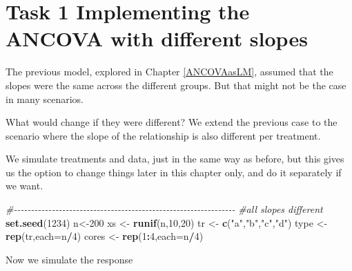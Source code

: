 \documentclass[
]{book}
\newenvironment{Shaded}{\begin{snugshade}}{\end{snugshade}}
\newcommand{\AttributeTok}[1]{\textcolor[rgb]{0.13,0.29,0.53}{#1}}
\newcommand{\CommentTok}[1]{\textcolor[rgb]{0.56,0.35,0.01}{\textit{#1}}}
\newcommand{\DecValTok}[1]{\textcolor[rgb]{0.00,0.00,0.81}{#1}}
\newcommand{\FunctionTok}[1]{\textcolor[rgb]{0.13,0.29,0.53}{\textbf{#1}}}
\newcommand{\NormalTok}[1]{#1}
\newcommand{\OtherTok}[1]{\textcolor[rgb]{0.56,0.35,0.01}{#1}}
\newcommand{\SpecialCharTok}[1]{\textcolor[rgb]{0.81,0.36,0.00}{\textbf{#1}}}
\newcommand{\StringTok}[1]{\textcolor[rgb]{0.31,0.60,0.02}{#1}}
\begin{document}
\section{Task 1 Implementing the ANCOVA with different slopes}\label{task-1-implementing-the-ancova-with-different-slopes}

The previous model, explored in Chapter \ref{ANCOVAasLM}, assumed that the slopes were the same across the different groups. But that might not be the case in many scenarios.

What would change if they were different? We extend the previous case to the scenario where the slope of the relationship is also different per treatment.

We simulate treatments and data, just in the same way as before, but this gives us the option to change things later in this chapter only, and do it separately if we want.

\begin{Shaded}
\begin{Highlighting}[]
\CommentTok{\#{-}{-}{-}{-}{-}{-}{-}{-}{-}{-}{-}{-}{-}{-}{-}{-}{-}{-}{-}{-}{-}{-}{-}{-}{-}{-}{-}{-}{-}{-}{-}{-}{-}{-}{-}{-}{-}{-}{-}{-}{-}{-}{-}{-}{-}{-}{-}{-}{-}{-}{-}{-}{-}{-}{-}{-}{-}{-}{-}{-}{-}{-}{-}{-}}
\CommentTok{\#all slopes different}
\FunctionTok{set.seed}\NormalTok{(}\DecValTok{1234}\NormalTok{)}
\NormalTok{n}\OtherTok{\textless{}{-}}\DecValTok{200}
\NormalTok{xs }\OtherTok{\textless{}{-}} \FunctionTok{runif}\NormalTok{(n,}\DecValTok{10}\NormalTok{,}\DecValTok{20}\NormalTok{)}
\NormalTok{tr }\OtherTok{\textless{}{-}} \FunctionTok{c}\NormalTok{(}\StringTok{"a"}\NormalTok{,}\StringTok{"b"}\NormalTok{,}\StringTok{"c"}\NormalTok{,}\StringTok{"d"}\NormalTok{)}
\NormalTok{type }\OtherTok{\textless{}{-}} \FunctionTok{rep}\NormalTok{(tr,}\AttributeTok{each=}\NormalTok{n}\SpecialCharTok{/}\DecValTok{4}\NormalTok{)}
\NormalTok{cores }\OtherTok{\textless{}{-}} \FunctionTok{rep}\NormalTok{(}\DecValTok{1}\SpecialCharTok{:}\DecValTok{4}\NormalTok{,}\AttributeTok{each=}\NormalTok{n}\SpecialCharTok{/}\DecValTok{4}\NormalTok{)}
\end{Highlighting}
\end{Shaded}

Now we simulate the response
\end{document}
